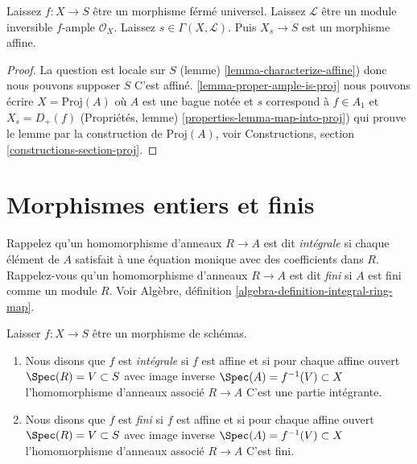 \begin{lemma}

\label{lemma-proper-ample-delete-affine}
Laissez $f : X \to S$ être un morphisme férmé universel. Laissez $\mathcal{L}$ être un module inversible $f$-ample $\mathcal{O}_X$. Laissez $s \in \Gamma(X, \mathcal{L})$. Puis $X_s \to S$ est un morphisme affine.
\end{lemma}

\begin{proof}

La question est locale sur $S$ (lemme) \ref{lemma-characterize-affine}) donc nous pouvons supposer $S$ C'est affiné. \ref{lemma-proper-ample-is-proj}
nous pouvons écrire $X = \text{Proj}(A)$ où $A$ est une bague notée et $s$ correspond à $f \in A_1$ et
$X_s = D_+(f)$ (Propriétés, lemme) \ref{properties-lemma-map-into-proj}) qui prouve le lemme par la construction de $\text{Proj}(A)$, voir Constructions, section \ref{constructions-section-proj}.

\end{proof}











\section{Morphismes entiers et finis}
\label{section-integral}

\noindent
Rappelez qu'un homomorphisme d'anneaux $R \to A$ est dit {\it intégrale} si chaque élément de $A$ satisfait à une équation monique avec des coefficients dans $R$. Rappelez-vous qu'un homomorphisme d'anneaux $R \to A$ est dit {\it fini} si $A$ est fini comme un module $R$. Voir Algèbre, définition \ref{algebra-definition-integral-ring-map}.

\begin{definition}

\label{definition-integral}

Laisser $f : X \to S$ être un morphisme de schémas.

\begin{enumerate}

\item Nous disons que $f$ est {\it intégrale} si $f$ est affine et si pour chaque affine ouvert $\Spec(R) = V \subset S$
avec image inverse $\Spec(A) = f^{-1}(V) \subset X$
l'homomorphisme d'anneaux associé $R \to A$ C'est une partie intégrante.
\item Nous disons que $f$ est {\it fini} si $f$ est affine et si pour chaque affine ouvert $\Spec(R) = V \subset S$
avec image inverse $\Spec(A) = f^{-1}(V) \subset X$
l'homomorphisme d'anneaux associé $R \to A$ C'est fini.

\end{enumerate}

\end{definition}

